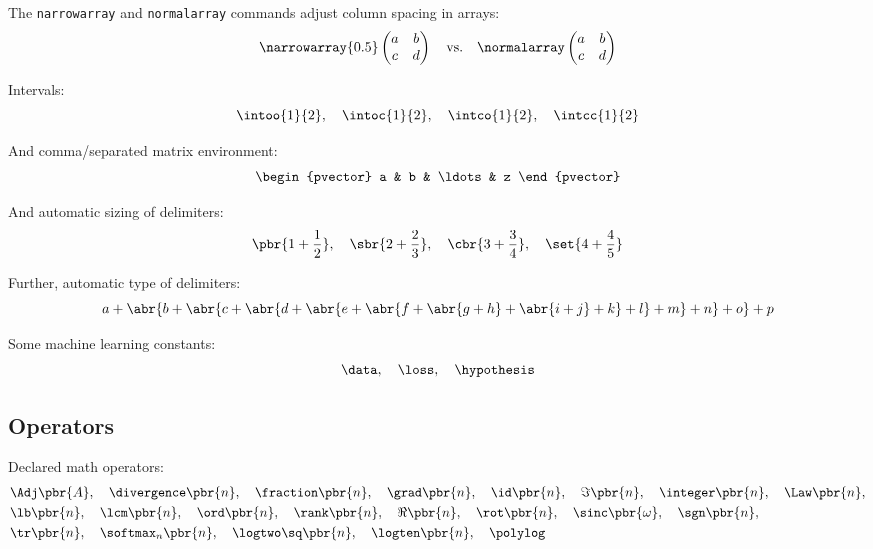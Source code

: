 The \texttt{narrowarray} and \texttt{normalarray} commands adjust column spacing in arrays:
\begin{equation*}
    \narrowarray{0.5}
    \begin{pmatrix}
        a & b \\
        c & d
    \end{pmatrix}
    \quad \text{vs.} \quad
    \normalarray
    \begin{pmatrix}
        a & b \\
        c & d
    \end{pmatrix}
\end{equation*}

Intervals:
\begin{equation*}
    \intoo{1}{2}, \quad \intoc{1}{2}, \quad \intco{1}{2}, \quad \intcc{1}{2}
\end{equation*}

And comma\-/separated matrix environment:
\begin{equation*}
    \begin{pvector}
        a & b & \ldots & z
    \end{pvector}
\end{equation*}

And automatic sizing of delimiters:
\begin{equation*}
    \pbr{1 + \frac{1}{2}},
    \quad \sbr{2 + \frac{2}{3}},
    \quad \cbr{3 + \frac{3}{4}},
    \quad \set{4 + \frac{4}{5}}
\end{equation*}

Further, automatic type of delimiters:
\begin{equation*}
    a + \abr{b + \abr{c + \abr{d + \abr{e + \abr{f + \abr{g + h} + \abr{i + j} + k} + l} + m} + n} + o} + p
\end{equation*}

Some machine learning constants:
\begin{equation*}
    \data,
    \quad \loss,
    \quad \hypothesis
\end{equation*}

\subsection{Operators}

Declared math operators:
\begin{align*}
    &\Adj\pbr{A},
    \quad \divergence\pbr{n},
    \quad \fraction\pbr{n},
    \quad \grad\pbr{n},
    \quad \id\pbr{n},
    \quad \Im\pbr{n},
    \quad \integer\pbr{n},
    \quad \Law\pbr{n}, \\
    &\lb\pbr{n},
    \quad \lcm\pbr{n},
    \quad \ord\pbr{n},
    \quad \rank\pbr{n},
    \quad \Re\pbr{n},
    \quad \rot\pbr{n},
    \quad \sinc\pbr{\omega},
    \quad \sgn\pbr{n}, \\
    &\tr\pbr{n},
    \quad \softmax_n\pbr{n},
    \quad \logtwo\sq\pbr{n},
    \quad \logten\pbr{n},
    \quad \polylog
\end{align*}

